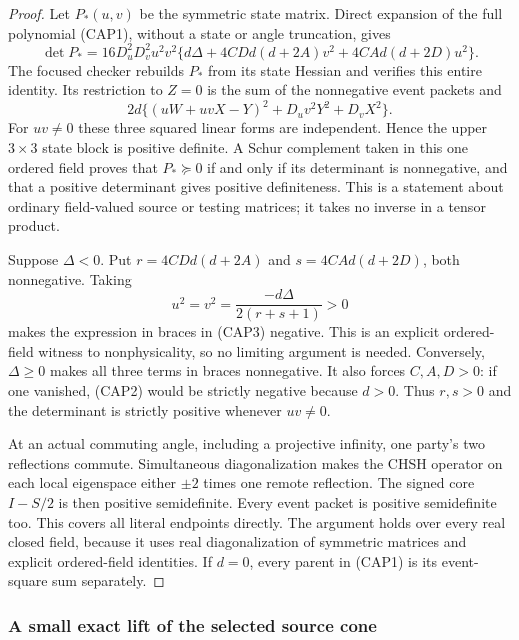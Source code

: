 \begin{proof}
Let $P_*(u,v)$ be the symmetric state matrix.  Direct expansion of the
full polynomial (CAP1), without a state or angle truncation, gives
\[
\det P_*=16D_u^2D_v^2u^2v^2
 \{d\Delta+4CDd(d+2A)v^2+4CAd(d+2D)u^2\}.
\tag{CAP3}
\]
The focused checker rebuilds $P_*$ from its state Hessian and verifies
this entire identity.  Its restriction to $Z=0$ is the sum of the
nonnegative event packets and
\[
2d\{(uW+uvX-Y)^2+D_uv^2Y^2+D_vX^2\}.
\tag{CAP4}
\]
For $uv\ne0$ these three squared linear forms are independent.  Hence
the upper $3\times3$ state block is positive definite.  A Schur
complement taken in this one ordered field proves that $P_*\succeq0$
if and only if its determinant is nonnegative, and that a positive
determinant gives positive definiteness.  This is a statement about
ordinary field-valued source or testing matrices; it takes no inverse
in a tensor product.

Suppose $\Delta<0$.  Put $r=4CDd(d+2A)$ and
$s=4CAd(d+2D)$, both nonnegative.  Taking
\[
u^2=v^2=\frac{-d\Delta}{2(r+s+1)}>0
\]
makes the expression in braces in (CAP3) negative.  This is an explicit
ordered-field witness to nonphysicality, so no limiting argument is
needed.  Conversely, $\Delta\geq0$ makes all three terms in braces
nonnegative.  It also forces $C,A,D>0$: if one vanished, (CAP2) would
be strictly negative because $d>0$.  Thus $r,s>0$ and the determinant
is strictly positive whenever $uv\ne0$.

At an actual commuting angle, including a projective infinity, one
party's two reflections commute.  Simultaneous diagonalization makes
the CHSH operator on each local eigenspace either $\pm2$ times one
remote reflection.  The signed core $I-S/2$ is then positive
semidefinite.  Every event packet is positive semidefinite too.  This
covers all literal endpoints directly.  The argument holds over every
real closed field, because it uses real diagonalization of symmetric
matrices and explicit ordered-field identities.  If $d=0$, every
parent in (CAP1) is its event-square sum separately.
\end{proof}

\subsubsection*{A small exact lift of the selected source cone}

